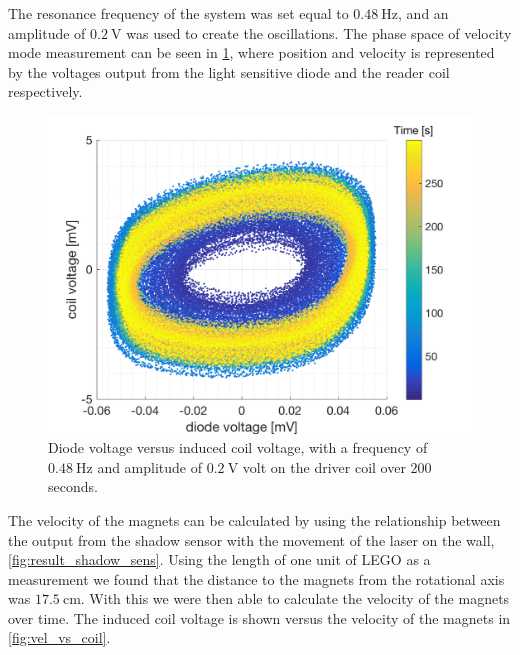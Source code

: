\documentclass[english,a4paper,12pt,reprint]{revtex4-1}
\begin{document}
The resonance frequency of the system was set equal to $\SI{0.48}{\hertz}$, and an amplitude of $\SI{0.2}{\volt}$ was used to create the oscillations. The phase space of velocity mode measurement can be seen in \cref{fig:phase_space}, where position and velocity is represented by the voltages output from the light sensitive diode and the reader coil respectively.
\begin{figure}[htpb]
    \centering
    \includegraphics[scale=0.44]{phasespace.png}
    \caption{Diode voltage versus induced coil voltage, with a frequency of $\SI{0.48}{\hertz}$ and amplitude of $\SI{0.2}{\volt}$ volt on the driver coil over $200$ seconds.}
    \label{fig:phase_space}
\end{figure}
The velocity of the magnets can be calculated by using the relationship between the output from the shadow sensor with the movement of the laser on the wall, \vref{fig:result_shadow_sens}. Using the length of one unit of LEGO as a measurement we found that the distance to the magnets from the rotational axis was $\SI{17.5}{\centi\meter}$. With this we were then able to calculate the velocity of the magnets over time. The induced coil voltage is shown versus the velocity of the magnets in \vref{fig:vel_vs_coil}.
\end{document}
